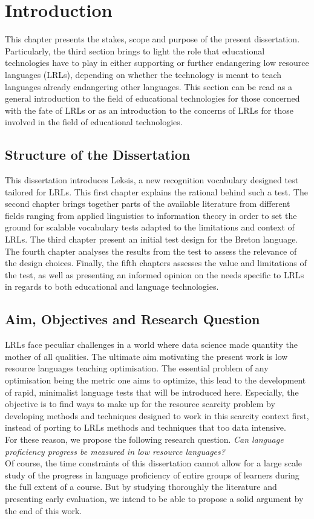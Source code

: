 \chapter{Introduction}    
This chapter presents the stakes, scope and purpose of the present dissertation. Particularly, the third section brings to light the role that educational technologies have to play in either supporting or further endangering low resource languages (LRLs), depending on whether the technology is meant to teach languages already endangering other languages. This section can be read as a general introduction to the field of educational technologies for those concerned with the fate of LRLs or as an introduction to the concerns of LRLs for those involved in the field of educational technologies.

\section{Structure of the Dissertation}
This dissertation introduces Leksis, a new recognition vocabulary designed test tailored for LRLs. This first chapter explains the rational behind such a test. The second chapter brings together parts of the available literature from different fields ranging from applied linguistics to information theory in order to set the ground for scalable vocabulary tests adapted to the limitations and context of LRLs. The third chapter present an initial test design for the Breton language. The fourth chapter analyses the results from the test to assess the relevance of the design choices. Finally, the fifth chapters assesses the value and limitations of the test, as well as presenting an informed opinion on the needs specific to LRLs in regards to both educational and language technologies.

\section{Aim, Objectives and Research Question}
LRLs face peculiar challenges in a world where data science made quantity the mother of all qualities. The ultimate aim motivating the present work is low resource languages teaching optimisation. The essential problem of any optimisation being the metric one aims to optimize, this lead to the development of rapid, minimalist language tests that will be introduced here. Especially, the objective is to find ways to make up for the resource scarcity problem by developing methods and techniques designed to work in this scarcity context first, instead of porting to LRLs methods and techniques that too data intensive.\\
For these reason, we propose the following research question. \textit{Can language proficiency progress be measured in low resource languages?}\\
Of course, the time constraints of this dissertation cannot allow for a large scale study of the progress in language proficiency of entire groups of learners during the full extent of a course. But by studying thoroughly the literature and presenting early evaluation, we intend to be able to propose a solid argument by the end of this work.

